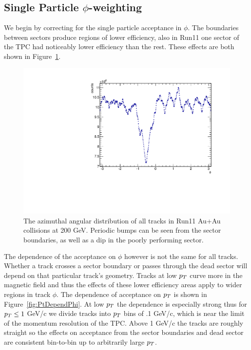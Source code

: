 \subsection{Single Particle $\phi$-weighting}

We begin by correcting for the single particle acceptance in $\phi$. The boundaries between sectors produce regions of lower efficiency, also in Run11 one sector of the TPC had noticeably lower efficiency than the rest. These effects are both shown in Figure~\ref{fig:PhiDistAllTracks}.  

\begin{figure}[htbp]
\begin{center}
\includegraphics[scale=.75]{Plots/Correlations/Phi_All.pdf}
\end{center}
\caption[Phi distribution for all tracks in TPC.]{The azimuthal angular distribution of all tracks in Run11 Au+Au collisions at 200 GeV. Periodic bumps can be seen from the sector boundaries, as well as a dip in the poorly performing sector.}
\label{fig:PhiDistAllTracks}
\end{figure}

The dependence of the acceptance on $\phi$ however is not the same for all tracks. Whether a track crosses a sector boundary or passes through the dead sector will depend on that particular track's geometry. Tracks at low $p_{T}$ curve more in the magnetic field and thus the effects of these lower efficiency areas apply to wider regions in track $\phi$. The dependence of acceptance on $p_{T}$ is shown in Figure~\ref{fig:PtDependPhi}. At low $p_{T}$ the dependence is especially strong thus for $p_{T} \leq 1$ GeV/c we divide tracks into $p_{T}$ bins of .1 GeV/c, which is near the limit of the momentum resolution of the TPC. Above 1 GeV/c the tracks are roughly straight so the effects on acceptance from the sector boundaries and dead sector are consistent bin-to-bin up to arbitrarily large $p_{T}$.

